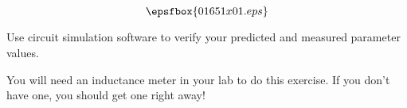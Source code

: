 

$$\epsfbox{01651x01.eps}$$

\vfil \eject






Use circuit simulation software to verify your predicted and measured parameter values.







You will need an inductance meter in your lab to do this exercise.  If you don't have one, you should get one right away!




